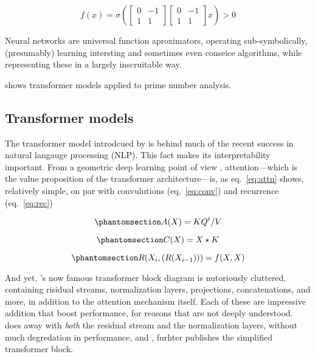 \documentclass[11pt]{article} %
\begin{document}
\begin{multicols}{2}
  \begin{equation}{
  f(x) = \sigma\left(\begin{bmatrix}0 & -1 \\ 1 & 1\end{bmatrix}\begin{bmatrix}0 & -1 \\ 1 & 1\end{bmatrix}x\right)> 0
  }\end{equation}

  Neural networks are universal function aproximators, operating
  sub-symbolically, (presumably) learning intersting and sometimes even
  conseice algorithms, while representing these in a largely
  inscruitable way.

  \textcite{lee2024} shows transformer models applied to prime number
  analysis.

  \subsection{Transformer models}\label{transformer-models}

  The transformer model introdcued by \textcite{vaswani2017} is behind
  much of the recent success in natural langauge processing (NLP). This
  fact makes its interpretability important. From a geometric deep
  learning point of view \autocite{bronstein2021}, attention---which is
  the value proposition of the transformer architecture---is, as
  eq.~\ref{eq:attn} shows, relatively simple, on par with convulutions
  (eq.~\ref{eq:conv}) and recurrence (eq.~\ref{eq:rec})

  \begin{equation}\phantomsection\label{eq:attn}{
  A(X) = KQ^t/V
  }\end{equation}

  \begin{equation}\phantomsection\label{eq:conv}{
  C(X) = X \star K
  }\end{equation}

  \begin{equation}\phantomsection\label{eq:rec}{
  R(X_i, (R(X_{i-1}))) = f(X, X)
  }\end{equation}

  And yet, \textcite{vaswani2017}'s now famous transformer block diagram
  is nutoriously cluttered, containing risidual streams, normalization
  layers, projections, concatenations, and more, in addition to the
  attention mechanism itself. Each of these are impressive addition that
  boost performance, for reasons that are not deeply understood.
  \textcite{he2023a} does away with \emph{both} the residual stream and
  the normalization layers, without much degredation in performance, and
  \textcite{he2023}, furhter publishes the simplified transformer block.


\end{multicols}
\end{document}
